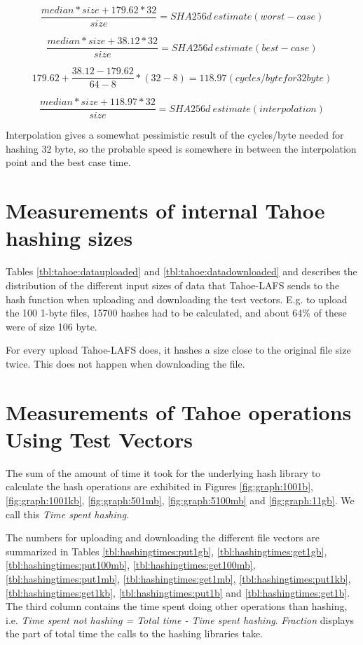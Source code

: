 \documentclass[english,12pt,a4paper]{book}
\begin{document}
$$\frac{median * size + 179.62*32}{size} = SHA256d\ estimate (worst-case)$$

$$\frac{median * size + 38.12*32}{size} = SHA256d\ estimate (best-case)$$

$$179.62 + \frac{38.12-179.62}{64-8}*(32-8) = 118.97 (cycles/byte for 32 byte)$$

$$\frac{median * size + 118.97*32}{size} = SHA256d\ estimate (interpolation)$$



Interpolation gives a somewhat pessimistic result of the cycles/byte needed for
hashing 32 byte, so the probable speed is somewhere in between the
interpolation point and the best case time.

\section{Measurements of internal Tahoe hashing sizes}
\label{sec:results:tahoedata}

Tables \ref{tbl:tahoe:datauploaded} and \ref{tbl:tahoe:datadownloaded} and
describes the distribution of the different input sizes of data that
Tahoe-\ac{LAFS} sends to the hash function when uploading and downloading the
test vectors. E.g. to upload the 100 1-byte files, 15700 hashes had to be
calculated, and about 64\% of these were of size 106 byte.

For every upload Tahoe-\ac{LAFS} does, it hashes a size close to the original
file size twice. This does not happen when downloading the file.



\section{Measurements of Tahoe operations Using Test Vectors}
The sum of the amount of time it took for the underlying hash library to
calculate the hash operations are exhibited in Figures \ref{fig:graph:1001b},
\ref{fig:graph:1001kb}, \ref{fig:graph:501mb}, \ref{fig:graph:5100mb} and
\ref{fig:graph:11gb}. We call this \emph{Time spent hashing}.

The numbers for uploading and downloading the different file vectors are
summarized in Tables \ref{tbl:hashingtimes:put1gb},
\ref{tbl:hashingtimes:get1gb}, \ref{tbl:hashingtimes:put100mb},
\ref{tbl:hashingtimes:get100mb}, \ref{tbl:hashingtimes:put1mb},
\ref{tbl:hashingtimes:get1mb}, \ref{tbl:hashingtimes:put1kb},
\ref{tbl:hashingtimes:get1kb}, \ref{tbl:hashingtimes:put1b} and
\ref{tbl:hashingtimes:get1b}.  The third column contains the time spent doing
other operations than hashing, i.e. \emph{Time spent not hashing = Total time -
Time spent hashing}. \emph{Fraction} displays the part of total time the calls
to the hashing libraries take.
\end{document}
